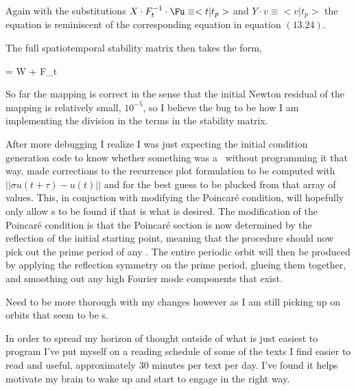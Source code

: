 \begin{description}
{\begin{description}
Again with the substitutions $X \cdot F^{-1}_t \cdot \Fu \equiv <t | t_p>$ and $Y \cdot v \equiv < v | t_p >$ the
equation is reminiscent of the corresponding equation in   equation $(13.24)$.

The full spatiotemporal stability matrix then takes the form,

\beq
{} = W + F_t \cdot {}
\eeq

So far the mapping is correct in the sense that the initial Newton residual of the mapping
is relatively small, $10^{-5}$, so I believe the bug to be how I am implementing the division
in the terms in the stability matrix.

\item[initial condition generation code]
After more debugging I realize I was just expecting the initial condition generation
code to know whether something was a \ppo\ without programming it that way,
made corrections to the recurrence plot formulation to be computed with
$||\sigma u(t + \tau) - u(t)||$ and for the best guess to be plucked from that array of
values. This, in conjuction with modifying the Poincar\'e condition, will hopefully
only allow {\ppo}s to be found if that is what is desired. The modification of the
Poincar\'e condition is that the Poincar\'e section is now determined by the reflection
of the initial starting point, meaning that the procedure should now pick out the prime
period of any \ppo. The entire periodic orbit will then be produced by applying the
reflection symmetry on the prime period, glueing them together, and smoothing out
any high Fourier mode components that exist.

Need to be more thorough with my changes however as I am still picking up on orbits that
seem to be {\rpo}s.



\item[reading]
In order to spread my horizon of thought outside of what is just easiest to program
I've put myself on a reading schedule of some of the texts I find easier to read
and useful, approximately 30 minutes per text per day. I've found it helps motivate
my brain to wake up and start to engage in the right way.

\end{description}
}

\end{description}

